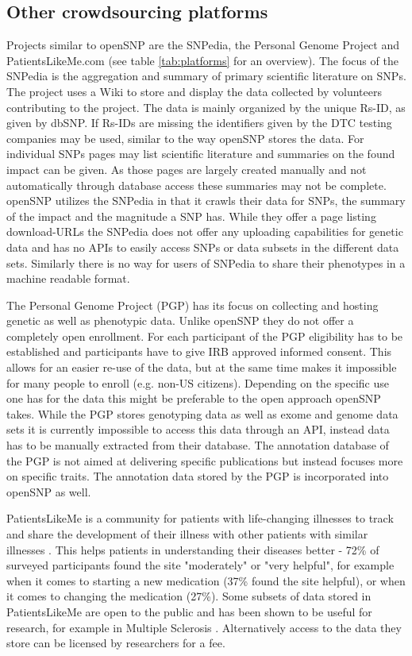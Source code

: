 \documentclass[10pt]{article}
\begin{document}
\subsection*{Other crowdsourcing platforms}
Projects similar to openSNP are the SNPedia, the Personal Genome Project and PatientsLikeMe.com (see table \ref{tab:platforms} for an overview). The focus of the SNPedia is the aggregation and summary of primary scientific literature on SNPs. The project uses a Wiki to store and display the data collected by volunteers contributing to the project. The data is mainly organized by the unique Rs-ID, as given by dbSNP. If Rs-IDs are missing the identifiers given by the DTC testing companies may be used, similar to the way openSNP stores the data. For individual SNPs pages may list scientific literature and summaries on the found impact can be given. As those pages are largely created manually and not automatically through database access these summaries may not be complete. openSNP utilizes the SNPedia in that it crawls their data for SNPs, the summary of the impact and the magnitude a SNP has. While they offer a page listing download-URLs the SNPedia does not offer any uploading capabilities for genetic data and has no APIs to easily access SNPs or data subsets in the different data sets. Similarly there is no way for users of SNPedia to share their phenotypes in a machine readable format. 

The Personal Genome Project (PGP) has its focus on collecting and hosting genetic as well as phenotypic data. Unlike openSNP they do not offer a completely open enrollment. For each participant of the PGP eligibility has to be established and participants have to give IRB approved informed consent. This allows for an easier re-use of the data, but at the same time makes it impossible for many people to enroll (e.g. non-US citizens). Depending on the specific use one has for the data this might be preferable to the open approach openSNP takes. While the PGP stores genotyping data as well as exome and genome data sets it is currently impossible to access this data through an API, instead data has to be manually extracted from their database. The annotation database of the PGP is not aimed at delivering specific publications but instead focuses more on specific traits. The annotation data stored by the PGP is incorporated into openSNP as well. 

PatientsLikeMe is a community for patients with life-changing illnesses to track and share the development of their illness with other patients with similar illnesses \cite{Wicks2010}.  This helps patients in understanding their diseases better - 72\% of surveyed participants found the site "moderately" or "very helpful", for example when it comes to starting a new medication (37\% found the site helpful), or when it comes to changing the medication (27\%). Some subsets of data stored in PatientsLikeMe are open to the public and has been shown to be useful for research, for example in Multiple Sclerosis \cite{Bove2013}. Alternatively access to the data they store can be licensed by researchers for a fee. 
\end{document}
